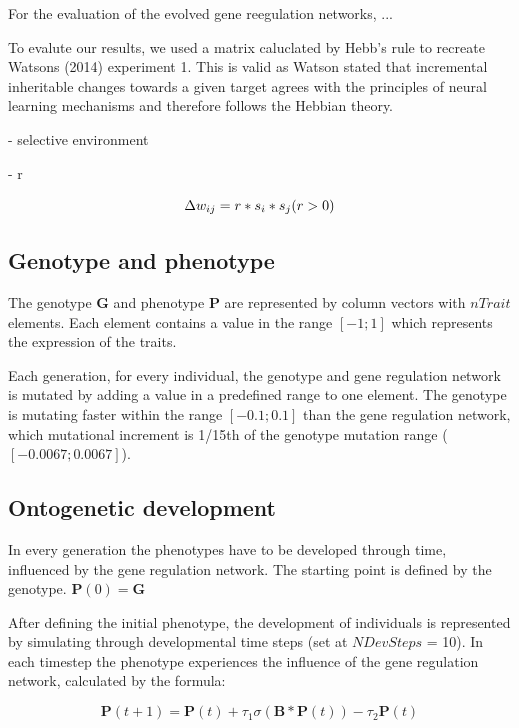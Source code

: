 \documentclass{article}
\begin{document}
For the evaluation of the evolved gene reegulation networks, ...

To evalute our results, we used a matrix caluclated by Hebb's rule to recreate Watsons (2014) experiment 1. This is valid as Watson stated that incremental inheritable changes towards a given target agrees with the principles of neural learning mechanisms and therefore follows the Hebbian theory.

- selective environment

- r

\begin{equation}
	\Delta w_{ij} = r * s_i * s_j \\
	(r > 0)
\end{equation}

\subsection{Genotype and phenotype}

The genotype $\bm{G}$ and phenotype $\bm{P}$ are represented by column vectors with $nTrait$ elements. Each element contains a value in the range $[-1; 1]$ which represents the expression of the traits.

Each generation, for every individual, the genotype and gene regulation network is mutated by adding a value in a predefined range to one element.
The genotype is mutating faster within the range $[-0.1; 0.1]$ than the gene regulation network, which mutational increment is 1/15th of the genotype mutation range ($[-0.0067; 0.0067]$).

\subsection{Ontogenetic development}

In every generation the phenotypes have to be developed through time, influenced by the gene regulation network. The starting point is defined by the genotype. $\bm{P}(0) = \bm{G}$

After defining the initial phenotype, the development of individuals is represented by simulating through developmental time steps (set at $NDevSteps$ = 10). In each timestep the phenotype experiences the influence of the gene regulation network, calculated by the formula: 

\begin{equation}
	\bm{P}(t+1) = \bm{P}(t) + \tau_1\sigma(\bm{B}*\bm{P}(t))-\tau_2\bm{P}(t)
\end{equation}
\end{document}
